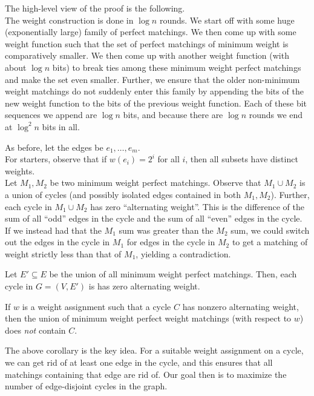 		The high-level view of the proof is the following.\\
		The weight construction is done in $\log n$ rounds. We start off with some huge (exponentially large) family of perfect matchings. We then come up with some weight function such that the set of perfect matchings of minimum weight is comparatively smaller. We then come up with another weight function (with about $\log n$ bits) to break ties among these minimum weight perfect matchings and make the set even smaller. Further, we ensure that the older non-minimum weight matchings do not suddenly enter this family by appending the bits of the new weight function to the bits of the previous weight function. Each of these bit sequences we append are $\log n$ bits, and because there are $\log n$ rounds we end at $\log^2 n$ bits in all.

		As before, let the edges be $e_1,\ldots,e_m$.\\
		For starters, observe that if $w(e_i) = 2^i$ for all $i$, then all subsets have distinct weights.\\
		Let $M_1,M_2$ be two minimum weight perfect matchings. Observe that $M_1 \cup M_2$ is a union of cycles (and possibly isolated edges contained in both $M_1,M_2$). Further, each cycle in $M_1 \cup M_2$ has zero ``alternating weight''. This is the difference of the sum of all ``odd'' edges in the cycle and the sum of all ``even'' edges in the cycle. If we instead had that the $M_1$ sum was greater than the $M_2$ sum, we could switch out the edges in the cycle in $M_1$ for edges in the cycle in $M_2$ to get a matching of weight strictly less than that of $M_1$, yielding a contradiction.

		\begin{flem}
			Let $E' \subseteq E$ be the union of all minimum weight perfect matchings. Then, each cycle in $G = (V,E')$ is has zero alternating weight.
		\end{flem}
		
		\begin{corollary}
			If $w$ is a weight assignment such that a cycle $C$ has nonzero alternating weight, then the union of minimum weight perfect weight matchings (with respect to $w$) does \emph{not} contain $C$.
		\end{corollary}

		The above corollary is the key idea. For a suitable weight assignment on a cycle, we can get rid of at least one edge in the cycle, and this ensures that all matchings containing that edge are rid of. Our goal then is to maximize the number of edge-disjoint cycles in the graph.


